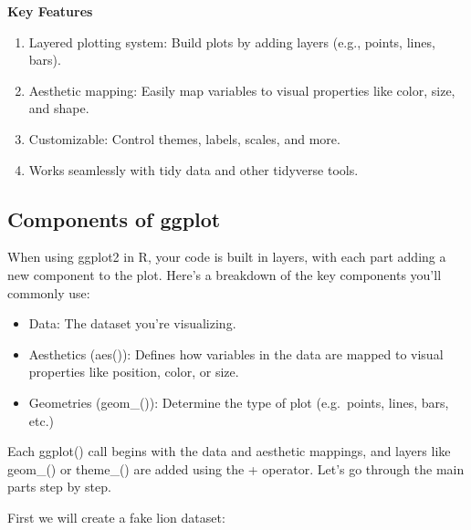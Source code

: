 \documentclass[
]{book}
\providecommand{\tightlist}{%
  \setlength{\itemsep}{0pt}\setlength{\parskip}{0pt}}
\begin{document}
\textbf{Key Features}

\begin{enumerate}
\def\labelenumi{\arabic{enumi}.}
\tightlist
\item
  Layered plotting system: Build plots by adding layers (e.g., points, lines, bars).
\item
  Aesthetic mapping: Easily map variables to visual properties like color, size, and shape.
\item
  Customizable: Control themes, labels, scales, and more.
\item
  Works seamlessly with tidy data and other tidyverse tools.
\end{enumerate}

\subsection{Components of ggplot}\label{components-of-ggplot}

When using ggplot2 in R, your code is built in layers, with each part adding a new component to the plot. Here's a breakdown of the key components you'll commonly use:

\begin{itemize}
\tightlist
\item
  Data: The dataset you're visualizing.
\item
  Aesthetics (aes()): Defines how variables in the data are mapped to visual properties like position, color, or size.
\item
  Geometries (geom\_()): Determine the type of plot (e.g.~points, lines, bars, etc.)
\end{itemize}

Each ggplot() call begins with the data and aesthetic mappings, and layers like geom\_() or theme\_() are added using the + operator. Let's go through the main parts step by step.

First we will create a fake lion dataset:
\end{document}
